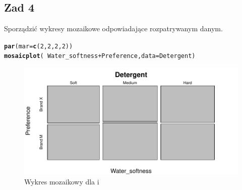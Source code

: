 \documentclass[12pt]{mwart}\usepackage[]{graphicx}\usepackage[]{color}
\makeatletter
\def\maxwidth{ %
  \ifdim\Gin@nat@width>\linewidth
    \linewidth
  \else
    \Gin@nat@width
  \fi
}
\newcommand{\hlnum}[1]{\textcolor[rgb]{0.686,0.059,0.569}{#1}}%
\newcommand{\hlopt}[1]{\textcolor[rgb]{0,0,0}{#1}}%
\newcommand{\hlstd}[1]{\textcolor[rgb]{0.345,0.345,0.345}{#1}}%
\newcommand{\hlkwc}[1]{\textcolor[rgb]{0.333,0.667,0.333}{#1}}%
\newcommand{\hlkwd}[1]{\textcolor[rgb]{0.737,0.353,0.396}{\textbf{#1}}}%
\newenvironment{kframe}{%
 \def\at@end@of@kframe{}%
 \ifinner\ifhmode%
  \def\at@end@of@kframe{\end{minipage}}%
  \begin{minipage}{\columnwidth}%
 \fi\fi%
 \def\FrameCommand##1{\hskip\@totalleftmargin \hskip-\fboxsep
 \colorbox{shadecolor}{##1}\hskip-\fboxsep
     \hskip-\linewidth \hskip-\@totalleftmargin \hskip\columnwidth}%
 \MakeFramed {\advance\hsize-\width
   \@totalleftmargin\z@ \linewidth\hsize
   \@setminipage}}%
 {\par\unskip\endMakeFramed%
 \at@end@of@kframe}
\newenvironment{knitrout}{}{} %
\makeatother
\begin{document}
  \subsection*{Zad 4}
  Sporządzić wykresy mozaikowe odpowiadające rozpatrywanym danym.
\begin{knitrout}
\color{fgcolor}\begin{kframe}
\begin{alltt}
\hlkwd{par}\hlstd{(}\hlkwc{mar} \hlstd{=} \hlkwd{c}\hlstd{(}\hlnum{2}\hlstd{,} \hlnum{2}\hlstd{,} \hlnum{2}\hlstd{,} \hlnum{2}\hlstd{))}
\hlkwd{mosaicplot}\hlstd{(}\hlopt{~}\hlstd{Water_softness}\hlopt{+}\hlstd{Preference,} \hlkwc{data} \hlstd{= Detergent)}
\end{alltt}
\end{kframe}\begin{figure}[H]
\includegraphics[width=\maxwidth]{figure/fig_3-1} \caption{\label{fig:3}Wykres mozaikowy dla  i }\label{fig:fig_3}
\end{figure}

\end{knitrout}
\end{document}
